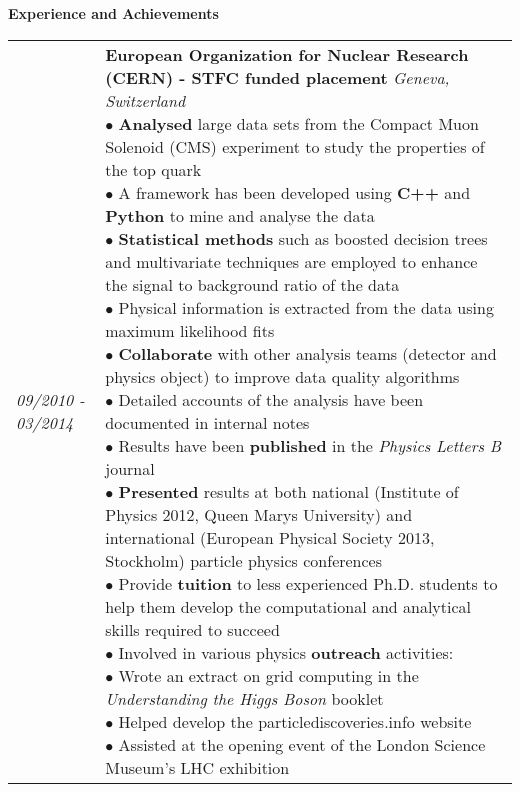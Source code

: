 \documentclass[letterpaper,11pt]{article}
\makeatletter
\newcommand{\resheading}[1]{{\large
\colorbox{mygrey}{\begin{minipage}{\textwidth}{\textbf{#1
\vphantom{p\^{E}}}}\end{minipage}}}\vspace{6pt}}
\newenvironment{entrylist}{%
  \begin{tabular*}{\textwidth}{@{\extracolsep{\fill}}ll}
}{%
  \end{tabular*}
}
\newcommand{\entry}[4]{%
  \textit{#1}&\parbox[t]{14.8cm}{%
    \textbf{#2}%
    \hfill%
    {\footnotesize \textit{\textcolor{mygrey2}{#3}}}\\%
    #4\vspace{12pt}%
  }\\}
\makeatother
\begin{document}
\resheading{Experience and Achievements}
\begin{entrylist}
  \entry
    {09/2010 - 03/2014}
    {European
    Organization for Nuclear Research (CERN) - STFC funded placement}
    {Geneva, Switzerland}
    {
    $\bullet$ \textbf{Analysed} large
    data sets from the Compact Muon Solenoid (CMS) experiment to study
    the properties of the top quark\\
    $\bullet$ A framework has been developed using \textbf{C++} and
    \textbf{Python} to mine and analyse the data \\
    $\bullet$ 
    \textbf{Statistical methods} such as boosted decision trees and multivariate
    techniques are employed to enhance the signal to background ratio of the
    data\\
    $\bullet$ 
    Physical information is extracted from the data using maximum
    likelihood fits \\
    $\bullet$ \textbf{Collaborate} with other analysis teams (detector and physics
    object) to improve data quality algorithms\\
    $\bullet$ Detailed accounts of the analysis have been documented in
    internal notes \\
	$\bullet$ Results have been \textbf{published} in the \emph{Physics Letters B}
    journal\\
    $\bullet$ \textbf{Presented} results at both national (Institute of Physics
    2012, Queen Marys University) and international (European Physical Society 2013,
    Stockholm) particle physics conferences\\
    $\bullet$ Provide \textbf{tuition} to less experienced Ph.D.
	students to help them develop the computational and analytical skills
	required to succeed\\
	$\bullet$ Involved in various physics \textbf{outreach} activities: \\
    \hspace*{5 mm} $\bullet$ Wrote an extract on grid computing in the
	\emph{Understanding the Higgs Boson} booklet \\
	\hspace*{5 mm} $\bullet$ Helped develop the particlediscoveries.info website
	\\
	\hspace*{5 mm} $\bullet$ Assisted at the opening event of the London Science
	Museum's LHC exhibition}
\end{entrylist}
\end{document}
